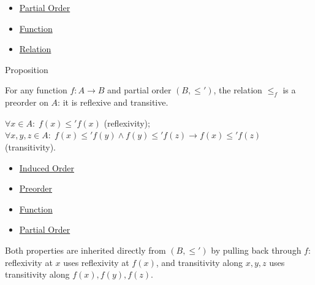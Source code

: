 \begin{dependencies}
\begin{itemize}
  \item \hyperref[def:partial-order]{Partial Order}
  \item \hyperref[def:function]{Function}
  \item \hyperref[def:relation]{Relation}
\end{itemize}
\end{dependencies}


\begin{propositionbox}{Proposition}
\begin{proposition}\label{prop:induced-preorder}
For any function $f : A \to B$ and partial order $(B, \leq')$, the relation
$\leq_f$ is a preorder on $A$: it is reflexive and transitive.
\end{proposition}
\end{propositionbox}

\begin{remark*}
$\forall x \in A:\; f(x)\leq' f(x)$ (reflexivity); $\forall x,y,z \in A:\; f(x)\leq' f(y) \wedge f(y)\leq' f(z) \to f(x)\leq' f(z)$ (transitivity).
\end{remark*}

\begin{dependencies}
\begin{itemize}
  \item \hyperref[def:induced-order]{Induced Order}
  \item \hyperref[def:preorder]{Preorder}
  \item \hyperref[def:function]{Function}
  \item \hyperref[def:partial-order]{Partial Order}
\end{itemize}
\end{dependencies}

\begin{remark*}
Both properties are inherited directly from $(B,\leq')$ by pulling back
through $f$: reflexivity at $x$ uses reflexivity at $f(x)$, and transitivity
along $x,y,z$ uses transitivity along $f(x),f(y),f(z)$.
\end{remark*}


